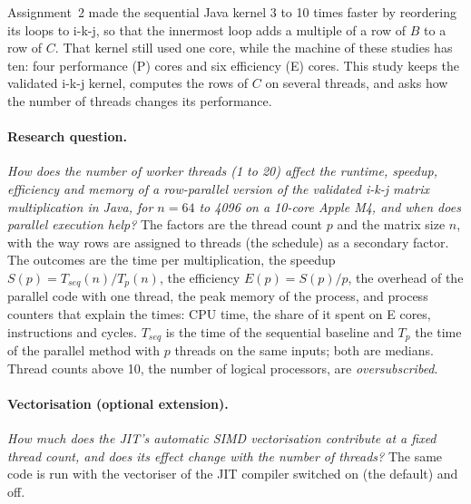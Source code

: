 \documentclass[11pt,a4paper]{article}
\begin{document}
Assignment~2 made the sequential Java kernel 3 to 10 times faster by
reordering its loops to i-k-j, so that the innermost loop adds a multiple of a
row of $B$ to a row of $C$. That kernel still used one core, while the machine
of these studies has ten: four performance (P) cores and six efficiency (E)
cores. This study keeps the validated i-k-j kernel, computes the rows of $C$ on
several threads, and asks how the number of threads changes its performance.

\paragraph{Research question.} \emph{How does the number of worker threads
(1 to 20) affect the runtime, speedup, efficiency and memory of a row-parallel
version of the validated i-k-j matrix multiplication in Java, for $n=64$ to
4096 on a 10-core Apple M4, and when does parallel execution help?} The factors
are the thread count $p$ and the matrix size $n$, with the way rows are
assigned to threads (the schedule) as a secondary factor. The outcomes are the
time per multiplication, the speedup $S(p)=T_{seq}(n)/T_p(n)$, the efficiency
$E(p)=S(p)/p$, the overhead of the parallel code with one thread, the peak
memory of the process, and process counters that explain the times: CPU time,
the share of it spent on E cores, instructions and cycles. $T_{seq}$ is the
time of the sequential baseline and $T_p$ the time of the parallel method with
$p$ threads on the same inputs; both are medians. Thread counts above 10, the
number of logical processors, are \emph{oversubscribed}.

\paragraph{Vectorisation (optional extension).} \emph{How much does the
JIT's automatic SIMD vectorisation contribute at a fixed thread count, and
does its effect change with the number of threads?} The same code is run with
the vectoriser of the JIT compiler switched on (the default) and off.
\end{document}

